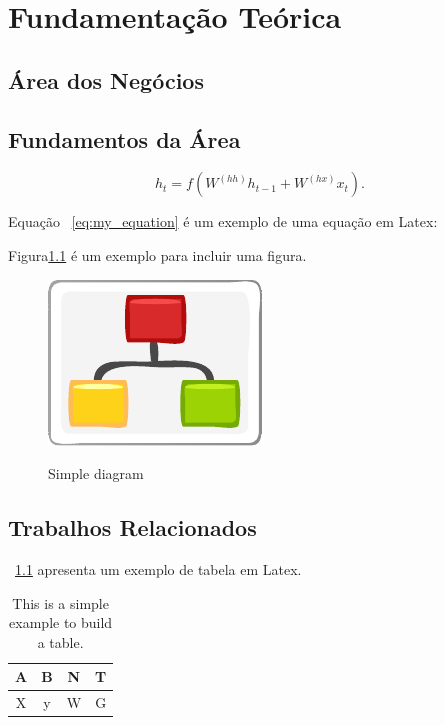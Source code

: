 
\chapter{Fundamentação Teórica}\label{chap:background}


\section{Área dos Negócios}\label{sec:business}


\section{Fundamentos da Área}\label{sec:fundamental}


\begin{equation}\label{eq:my_equation}
    h_t = f(W^{(hh)}h_{t-1} + W^{(hx)}x_t).
\end{equation}

Equação ~\ref{eq:my_equation} é um exemplo de uma equação em Latex:


Figura\ref{fig:diagram} é um exemplo para incluir uma figura.

\begin{figure}[htb]
    \caption{Simple diagram}
    \centering
    \includegraphics[scale=1.9]{img/diagram.pdf}
    \label{fig:diagram}
\end{figure}

\cite{GRIEBLER:IJPP:18}


\cite{MACCOOL:structured_patterns:book:12}


\section{Trabalhos Relacionados}\label{sec:rw}


\tablename~\ref{tab:my_table} apresenta um exemplo de tabela em Latex.

\begin{table}[htb]
    \caption{This is a simple example to build a table.}
    \label{tab:my_table}
    \centering
    \begin{tabular}{|c|c|c|c|}
        \hline
         A & B & N & T\\ 
         \hline
         X & y & W & G\\
         \hline
    \end{tabular}
    
\end{table}